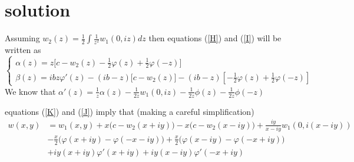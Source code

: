 \documentclass[a4paper]{article}      %
\begin{document}
\section{solution}

Assuming $w_2(z)=\frac{1}{2}\int\frac{1}{z^2}w_1(0,iz)dz$
then equations (\ref{H}) and (\ref{I}) will be written as
    \begin{equation}\label{J}
    \left\{{\begin{array}{*{20}{l}}
    \alpha(z)=z\big[c-w_2(z)-\frac{1}{2}\varphi(z)+\frac{1}{2}\varphi(-z)\big]\\
    \beta(z)=ibz\varphi'(z)-(ib-z)\big[c-w_2(z)\big]-(ib-z)[-\frac{1}{2}\varphi(z)+\frac{1}{2}\varphi(-z)]
    \end{array}}\right.
    \end{equation}
We know that $\alpha'(z)=\frac{1}{z}\alpha(z)-\frac{1}{2z}w_1(0,iz)-\frac{1}{2z}\phi(z)-\frac{1}{2z}\phi(-z)$

equations (\ref{K}) and (\ref{J}) imply that (making a careful simplification)
\begin{equation}\label{L}
    \begin{split}
    w(x,y)&=w_1(x,y)+x\big(c-w_2(x+iy)\big)-x\big(c-w_2(x-iy)\big)+\frac{iy}{x-iy}w_1(0,i(x-iy))\\
    &-\frac{x}{2}\big(\varphi(x+iy)-\varphi(-x-iy)\big)+\frac{x}{2}\big(\varphi(x-iy)-\varphi(-x+iy)\big)\\
    &+iy(x+iy)\varphi'(x+iy)+iy(x-iy)\varphi'(-x+iy)
    \end{split}
\end{equation}
\end{document}
